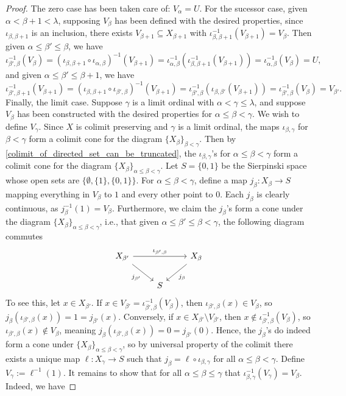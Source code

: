 \documentclass{amsart}
\theoremstyle{plain}
\theoremstyle{definition}
\newcommand{\sseq}{\subseteq}
\newcommand{\0}{\mathbf{0}}
\renewcommand{\(}{\left(}
\renewcommand{\)}{\right)}
\begin{document}
\begin{enumerate}[label=(\arabic*),listparindent=\parindent,parsep=5pt]
\begin{proof}
    The zero case has been taken care of: $V_\alpha=U$. For the sucessor case, given $\alpha<\beta+1<\lambda$, supposing $V_\beta$ has been defined with the desired properties, since $\iota_{\beta,\beta+1}$ is an inclusion, there exists $V_{\beta+1}\sseq X_{\beta+1}$ with $\iota_{\beta,\beta+1}^{-1}(V_{\beta+1})=V_\beta$. Then given $\alpha\leq\beta'\leq\beta$, we have
    \[\iota_{\beta',\beta}^{-1}(V_{\beta})=(\iota_{\beta,\beta+1}\circ\iota_{\alpha,\beta})^{-1}(V_{\beta+1})=\iota_{\alpha,\beta}^{-1}(\iota_{\beta,\beta+1}^{-1}(V_{\beta+1}))=\iota_{\alpha,\beta}^{-1}(V_\beta)=U,\]
    and given $\alpha\leq\beta'\leq\beta+1$, we have
    \[\iota_{\beta',\beta+1}^{-1}(V_{\beta+1})=(\iota_{\beta,\beta+1}\circ\iota_{\beta',\beta})^{-1}(V_{\beta+1})=\iota_{\beta',\beta}^{-1}(\iota_{\beta,\beta'}(V_{\beta+1}))=\iota_{\beta',\beta}^{-1}(V_\beta)=V_{\beta'}.\]
    Finally, the limit case. Suppose $\gamma$ is a limit ordinal with $\alpha<\gamma\leq\lambda$, and suppose $V_\beta$ has been constructed with the desired properties for $\alpha\leq\beta<\gamma$. We wish to define $V_\gamma$. Since $X$ is colimit preserving and $\gamma$ is a limit ordinal, the maps $\iota_{\beta,\gamma}$ for $\beta<\gamma$ form a colimit cone for the diagram $\{X_\beta\}_{\beta<\gamma}$. Then by \autoref{colimit_of_directed_set_can_be_truncated}, the $\iota_{\beta,\gamma}$'s for $\alpha\leq\beta<\gamma$ form a colimit cone for the diagram $\{X_\beta\}_{\alpha\leq\beta<\gamma}$. Let $S=\{0,1\}$ be the Sierpinski space whose open sets are $\{\emptyset,\{1\},\{0,1\}\}$. For $\alpha\leq\beta<\gamma$, define a map $j_\beta:X_\beta\to S$ mapping everything in $V_\beta$ to $1$ and every other point to $0$. Each $j_\beta$ is clearly continuous, as $j_\beta^{-1}(1)=V_\beta$. Furthermore, we claim the $j_\beta$'s form a cone under the diagram $\{X_\beta\}_{\alpha\leq\beta<\gamma}$, i.e., that given $\alpha\leq\beta'\leq\beta<\gamma$, the following diagram commutes
    \[\begin{tikzcd}
      {X_{\beta'} } && {X_\beta} \\
      & S
      \arrow["{\iota_{\beta',\beta}}", from=1-1, to=1-3]
      \arrow["{j_\beta}", from=1-3, to=2-2]
      \arrow["{j_{\beta'}}"', from=1-1, to=2-2]
    \end{tikzcd}\]
    To see this, let $x\in X_{\beta'}$. If $x\in V_{\beta'}=\iota_{\beta',\beta}^{-1}(V_\beta)$, then $\iota_{\beta',\beta}(x)\in V_\beta$, so $j_\beta(\iota_{\beta',\beta}(x))=1=j_{\beta'}(x)$. Conversely, if $x\in X_{\beta'}\setminus V_{\beta'}$, then $x\notin \iota_{\beta',\beta}^{-1}(V_\beta)$, so $\iota_{\beta',\beta}(x)\notin V_{\beta}$, meaning $j_\beta(\iota_{\beta',\beta}(x))=0=j_{\beta'}(0)$. Hence, the $j_\beta$'s do indeed form a cone under $\{X_\beta\}_{\alpha\leq\beta<\gamma}$, so by universal property of the colimit there exists a unique map $\ell:X_\gamma\to S$ such that $j_\beta=\ell\circ\iota_{\beta,\gamma}$ for all $\alpha\leq\beta<\gamma$. Define $V_\gamma:=\ell^{-1}(1)$. It remains to show that for all $\alpha\leq\beta\leq\gamma$ that $\iota_{\beta,\gamma}^{-1}(V_\gamma)=V_\beta$. Indeed, we have

\end{proof}
\end{enumerate}
\end{document}
